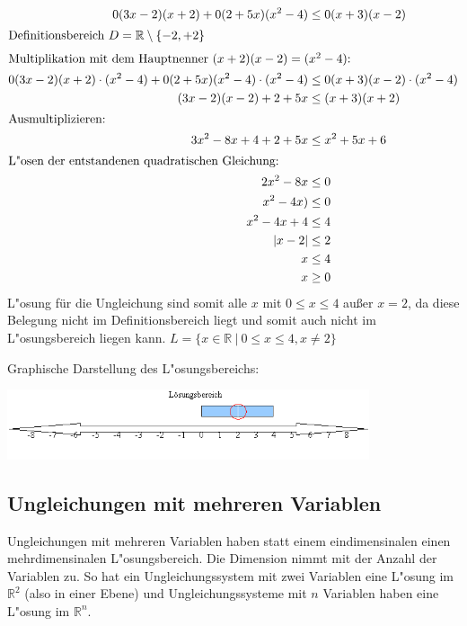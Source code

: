 \begin{align*}
\frac{(3x - 2)} {(x + 2)} + \frac{(2 + 5x)} {(x^2 - 4)} &\leq \frac{(x + 3)} {(x - 2)}\\
\intertext{Definitionsbereich $ D = \mathbb{R} \setminus \lbrace -2 , +2 \rbrace $}
\intertext{Multiplikation mit dem Hauptnenner $ (x + 2)(x - 2) = (x^2 - 4) $:}
\frac{(3x - 2)} {(x + 2)} \cdot (x^2 - 4) + \frac {(2 + 5x)} {(x^2 - 4)} \cdot (x^2 - 4) &\leq \frac{(x + 3)} {(x - 2)} \cdot (x^2 - 4)\\
(3x - 2)(x - 2) + 2 + 5x &\leq (x + 3)(x + 2)\\
\intertext{Ausmultiplizieren:}
3x^2 - 8x + 4 + 2 + 5x &\leq x^2 + 5x + 6\\
\intertext{L"osen der entstandenen quadratischen Gleichung:}
 2x^2 - 8x &\leq 0 \\
 x^2 - 4x) &\leq 0 \\
 x^2 - 4 x + 4 &\leq 4 \\
 |x - 2| &\leq 2 \\
x &\leq 4 \\
 x &\geq 0
\end{align*}
L"osung für die Ungleichung sind somit alle $ x $ mit $ 0 \leq x \leq 4 $ außer $ x = 2 $, da diese Belegung nicht im Definitionsbereich liegt und somit auch nicht im L"osungsbereich liegen kann.
$L = \lbrace x \in \mathbb{R}\ |\ 0 \leq x \leq 4 ,x \neq 2\rbrace $

Graphische Darstellung des L"osungsbereichs:
\begin{center}
\includegraphics[width=0.8\textwidth]{img/ungleichungen/LBer3.png}
\end{center}

\subsection{Ungleichungen mit mehreren Variablen}

Ungleichungen mit mehreren Variablen haben statt einem eindimensinalen einen mehrdimensinalen L"osungsbereich. Die Dimension nimmt mit der Anzahl der Variablen zu. So hat ein Ungleichungssystem mit zwei Variablen eine L"osung im $ \mathbb{R}^2 $ (also in einer Ebene) und Ungleichungssysteme mit $n$ Variablen haben eine L"osung im $\mathbb{R}^n$.

